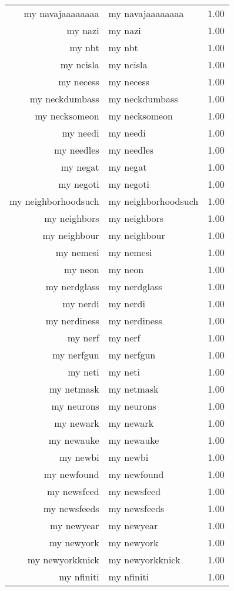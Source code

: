 \begin{table}[ht]
\begin{tabular}{rlr}
  my navajaaaaaaaa & my navajaaaaaaaa & 1.00 \\ 
  my nazi & my nazi & 1.00 \\ 
  my nbt & my nbt & 1.00 \\ 
  my ncisla & my ncisla & 1.00 \\ 
  my necess & my necess & 1.00 \\ 
  my neckdumbass & my neckdumbass & 1.00 \\ 
  my necksomeon & my necksomeon & 1.00 \\ 
  my needi & my needi & 1.00 \\ 
  my needles & my needles & 1.00 \\ 
  my negat & my negat & 1.00 \\ 
  my negoti & my negoti & 1.00 \\ 
  my neighborhoodsuch & my neighborhoodsuch & 1.00 \\ 
  my neighbors & my neighbors & 1.00 \\ 
  my neighbour & my neighbour & 1.00 \\ 
  my nemesi & my nemesi & 1.00 \\ 
  my neon & my neon & 1.00 \\ 
  my nerdglass & my nerdglass & 1.00 \\ 
  my nerdi & my nerdi & 1.00 \\ 
  my nerdiness & my nerdiness & 1.00 \\ 
  my nerf & my nerf & 1.00 \\ 
  my nerfgun & my nerfgun & 1.00 \\ 
  my neti & my neti & 1.00 \\ 
  my netmask & my netmask & 1.00 \\ 
  my neurons & my neurons & 1.00 \\ 
  my newark & my newark & 1.00 \\ 
  my newauke & my newauke & 1.00 \\ 
  my newbi & my newbi & 1.00 \\ 
  my newfound & my newfound & 1.00 \\ 
  my newsfeed & my newsfeed & 1.00 \\ 
  my newsfeeds & my newsfeeds & 1.00 \\ 
  my newyear & my newyear & 1.00 \\ 
  my newyork & my newyork & 1.00 \\ 
  my newyorkknick & my newyorkknick & 1.00 \\ 
  my nfiniti & my nfiniti & 1.00 \\ 

\end{tabular}
\end{table}
